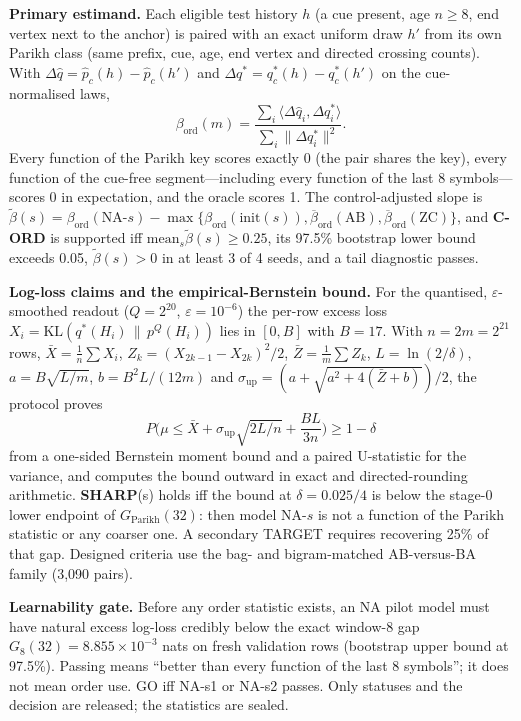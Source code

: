 \documentclass[11pt,a4paper]{article}
\newcommand{\KL}{\mathrm{KL}}
\DeclareRobustCommand{\_}{\ifmmode\origunderscore\else\textunderscore\allowbreak\fi}
\begin{document}
\textbf{Primary estimand.} Each eligible test history $h$ (a cue present, age $n\ge8$, end vertex
next to the anchor) is paired with an exact uniform draw $h'$ from its own Parikh class (same
prefix, cue, age, end vertex and directed crossing counts). With
$\Delta\hat q=\hat p_c(h)-\hat p_c(h')$ and $\Delta q^*=q^*_c(h)-q^*_c(h')$ on the cue-normalised laws,
\begin{equation}
\beta_{\mathrm{ord}}(m)=\frac{\sum_i\langle\Delta\hat q_i,\Delta q^*_i\rangle}{\sum_i\|\Delta q^*_i\|^2}.
\end{equation}
Every function of the Parikh key scores exactly 0 (the pair shares the key), every function of
the cue-free segment---including every function of the last 8 symbols---scores 0 in expectation,
and the oracle scores 1. The control-adjusted slope is
$\tilde\beta(s)=\beta_{\mathrm{ord}}(\mathrm{NA}\text{-}s)-\max\{\beta_{\mathrm{ord}}(\mathrm{init}(s)),
\overline{\beta}_{\mathrm{ord}}(\mathrm{AB}),\overline{\beta}_{\mathrm{ord}}(\mathrm{ZC})\}$, and
\textbf{C-ORD} is supported iff $\mathrm{mean}_s\tilde\beta(s)\ge0.25$, its 97.5\% bootstrap lower
bound exceeds 0.05, $\tilde\beta(s)>0$ in at least 3 of 4 seeds, and a tail diagnostic passes.

\textbf{Log-loss claims and the empirical-Bernstein bound.} For the quantised, $\varepsilon$-smoothed
readout ($Q=2^{20}$, $\varepsilon=10^{-6}$) the per-row excess loss
$X_i=\KL(q^*(H_i)\,\|\,p^Q(H_i))$ lies in $[0,B]$ with $B=17$. With $n=2m=2^{21}$ rows,
$\bar X=\tfrac1n\sum X_i$, $Z_k=(X_{2k-1}-X_{2k})^2/2$, $\bar Z=\tfrac1m\sum Z_k$, $L=\ln(2/\delta)$,
$a=B\sqrt{L/m}$, $b=B^2L/(12m)$ and $\sigma_{\mathrm{up}}=(a+\sqrt{a^2+4(\bar Z+b)})/2$, the protocol
proves
\begin{equation}
P\Big(\mu\le\bar X+\sigma_{\mathrm{up}}\sqrt{2L/n}+\frac{BL}{3n}\Big)\ge1-\delta
\end{equation}
from a one-sided Bernstein moment bound and a paired U-statistic for the variance,
and computes the bound outward in exact and directed-rounding
arithmetic. \textbf{SHARP}(s) holds iff the bound at $\delta=0.025/4$ is below the stage-0 lower
endpoint of $G_{\mathrm{Parikh}}(32)$: then model NA-$s$ is not a function of the Parikh statistic or
any coarser one. A secondary TARGET requires recovering 25\% of that gap. Designed criteria use
the bag- and bigram-matched AB-versus-BA family (3,090 pairs).

\textbf{Learnability gate.} Before any order statistic exists, an NA pilot model must have natural
excess log-loss credibly below the exact window-8 gap $G_8(32)=8.855\times10^{-3}$ nats on fresh
validation rows (bootstrap upper bound at 97.5\%). Passing means ``better than every function of
the last 8 symbols''; it does not mean order use. GO iff NA-s1 or NA-s2 passes. Only statuses and
the decision are released; the statistics are sealed.
\end{document}
